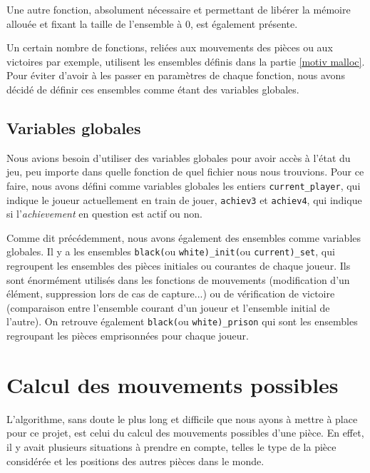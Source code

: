 \documentclass[a4paper]{article}
\begin{document}
Une autre fonction, absolument nécessaire et permettant de libérer la mémoire allouée et fixant la taille de l'ensemble à 0, est également présente.

\vspace{0.5cm}

Un certain nombre de fonctions, reliées aux mouvements des pièces ou aux victoires par exemple, utilisent les ensembles définis dans la partie \ref{motiv malloc}. Pour éviter d'avoir à les passer en paramètres de chaque fonction, nous avons décidé de définir ces ensembles comme étant des variables globales.

\subsection{Variables globales}
\label{var glob}

Nous avions besoin d'utiliser des variables globales pour avoir accès à l'état du jeu, peu importe dans quelle fonction de quel fichier nous nous trouvions. Pour ce faire, nous avons défini comme variables globales les entiers \verb|current_player|, qui indique le joueur actuellement en train de jouer, \verb|achiev3| et \verb|achiev4|, qui indique si l'\emph{achievement} en question est actif ou non.

Comme dit précédemment, nous avons également des ensembles comme variables globales. Il y a les ensembles \verb|black(|ou \verb|white)_init(|ou \verb|current)_set|, qui regroupent les ensembles des pièces initiales ou courantes de chaque joueur. Ils sont énormément utilisés dans les fonctions de mouvements (modification d'un élément, suppression lors de cas de capture...) ou de vérification de victoire (comparaison entre l'ensemble courant d'un joueur et l'ensemble initial de l'autre). On retrouve également \verb|black(|ou \verb|white)_prison| qui sont les ensembles regroupant les pièces emprisonnées pour chaque joueur.

\newpage

\section{Calcul des mouvements possibles}
\label{mvts}
L'algorithme, sans doute le plus long et difficile que nous ayons à mettre à place pour ce projet, est celui du calcul des mouvements possibles d'une pièce. En effet, il y avait plusieurs situations à prendre en compte, telles le type de la pièce considérée et les positions des autres pièces dans le monde.
\end{document}
